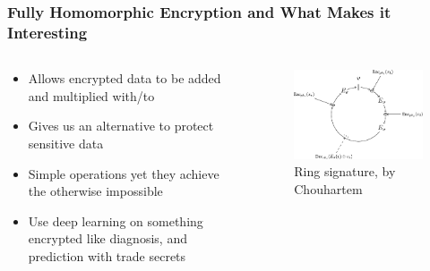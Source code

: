 \documentclass[aspectratio=169]{beamer}
\begin{document}
  \begin{frame}
    \frametitle{Fully Homomorphic Encryption and What Makes it Interesting}
    \begin{columns}
      \begin{column}{0.5\textwidth}
        \begin{itemize}
          \item Allows encrypted data to be added and multiplied with/to
          \item Gives us an alternative to protect sensitive data
          \item Simple operations yet they achieve the otherwise impossible
          \item Use deep learning on something encrypted like diagnosis, and prediction with trade secrets
        \end{itemize}
      \end{column}
      \begin{column}{0.5\textwidth}
        \begin{figure}[th!]
          \centering
          \includegraphics[width=1\textwidth]{ring-signature.pdf}
          \caption{Ring signature, by Chouhartem}
          \label{fig:jim_carrey}
        \end{figure}
      \end{column}
    \end{columns}
  \end{frame}
\end{document}
